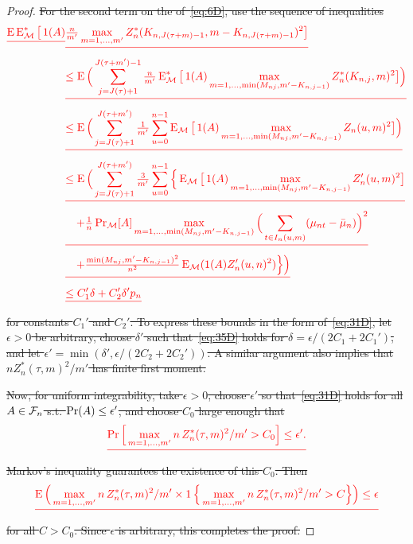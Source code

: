 \documentclass[11pt]{article}
\providecommand{\DIFdel}[1]{{\protect\color{red}\sout{#1}}}                      %
\begin{document}
\begin{proof}
\DIFdel{For the second term on the  of~\eqref{eq:6D},
  use the sequence of inequalities}
  \begin{align*}
  \DIFdel{\E \Em^* \big[\ind(A) }&\DIFdel{\tfrac{n}{m'}
  \max_{m=1,\dots,m'} Z_n^*(K_{n,J(\tau+m)-1}, m - K_{n,J(\tau + m)-1})^2 \big] }\\
  &\DIFdel{\leq \E \Big(\sum_{j=J(\tau) + 1}^{J(\tau+m')-1} \tfrac{n}{m'} \Em^* \big[\ind(A)
  \max_{m=1,\dots, \min(M_{nj}, m' - K_{n,j-1})} Z_n^*(K_{n,j}, m)^2 \big]\Big) }\\
  &\DIFdel{\leq \E \Big(\sum_{j=J(\tau) + 1}^{J(\tau+m')} \tfrac{1}{m'} \sum_{u=0}^{n-1} \Em \big[\ind(A)
  \max_{m=1,\dots,\min(M_{nj}, m' - K_{n,j-1})} Z_n(u, m)^2 \big]\Big) }\\
  &\DIFdel{\leq \E \Big(\sum_{j=J(\tau) + 1}^{J(\tau+m')} \tfrac{3}{m'} \sum_{u=0}^{n-1} \Big\{
  \Em \big[\ind(A)
  \max_{m=1,\dots,\min(M_{nj}, m' - K_{n,j-1})} Z_n'(u, m)^2 \big] }\\
  &\DIFdel{\quad +
  \tfrac{1}{n} \Pm[A] \max_{m = 1,\dots,\min(M_{nj}, m'-K_{n,j-1})}
  \Big(\sum_{t \in I_n(u,m)} (\mu_{nt} - \bar{\mu}_n)\Big)^2 }\\
  &\DIFdel{\quad+ \tfrac{\min(M_{nj},m'-K_{n,j-1})^2}{n^2} \Em( \ind(A) Z_n'(u, n)^2 ) \Big\}\Big)}\\
  &\DIFdel{\leq C'_1 \delta + C_2' \delta' p_n
  }\end{align*}
\DIFdel{for constants $C_1'$ and $C_2'$. To express these bounds in the form
  of~\eqref{eq:31D},
  let $\epsilon > 0$ be arbitrary, choose $\delta'$
  such that~\eqref{eq:35D} holds for $\delta = \epsilon/(2C_1+2C_1')$, and
  let $\epsilon' = \min(\delta', \epsilon/(2 C_2 + 2C_2'))$. A similar argument also
  implies that
  $n Z_n^*(\tau, m)^2 / m'$ has finite first moment.}

  \DIFdel{Now, for uniform integrability, take $\epsilon > 0$, choose
  $\epsilon'$ so that~\eqref{eq:31D} holds for all $A \in \mathcal{F}_n$
  s.t. $\operatorname{Pr}(A) \leq \epsilon'$, and choose $C_0$ large enough that}
  \begin{equation*}
    \DIFdel{\Pr\Big[ \max_{m = 1,\dots,m'} n \, Z^*_n(\tau, m)^2 / m' > C_0 \Big] \leq \epsilon'.}
  \end{equation*}
  \DIFdel{Markov's inequality guarantees the existence of this $C_0$. Then}
  \begin{equation*}
    \DIFdel{\E \Big(\max_{m = 1,\dots,m'} n \, Z^*_n(\tau, m)^2 / m'
    \times \ind\Big\{ \max_{m = 1,\dots,m'} n \, Z^*_n(\tau, m)^2 / m' > C \Big\}\Big) \leq \epsilon}
  \end{equation*}
  \DIFdel{for all $C > C_0$. Since $\epsilon$ is arbitrary, this completes the proof.}


\end{proof}
\end{document}
